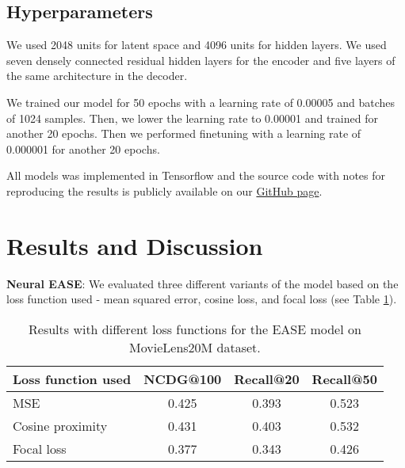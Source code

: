 \documentclass[conference]{IEEEtran}
\begin{document}
        \subsection{Hyperparameters}
        We used 2048 units for latent space and 4096 units for hidden layers. We used seven densely connected residual hidden layers for the encoder and five layers of the same architecture in the decoder.
        
        We trained our model for 50 epochs with a learning rate of 0.00005 and batches of 1024 samples. Then, we lower the learning rate to 0.00001 and trained for another 20 epochs. Then we performed finetuning with a learning rate of 0.000001 for another 20 epochs.
        
All models was implemented in Tensorflow\cite{tensorflow2015-whitepaper} and the source code with notes for reproducing the results is publicly available on our \href{https://github.com/zombak79/vasp}{GitHub page}.
    
\section{Results and Discussion}\label{results}
      
   
    \textbf{Neural EASE}: We evaluated three different variants of the model based on the loss function used - mean squared error, cosine loss, and focal loss (see Table \ref{tab:2}).
    
    \begin{table}[h]\label{tab:2}\caption{Results with different loss functions for the EASE model on MovieLens20M dataset.}
        \centering
        \begin{tabular}{@{}llll@{}}
            \toprule
            Loss function used & NCDG@100 & Recall@20 & Recall@50 \\ 
            \midrule
            MSE                & \multicolumn{1}{c}{0.425} & \multicolumn{1}{c}{0.393} & \multicolumn{1}{c}{0.523}           \\
            Cosine proximity & \multicolumn{1}{c}{0.431} & \multicolumn{1}{c}{0.403} & \multicolumn{1}{c}{0.532} \\
            Focal loss         &   \multicolumn{1}{c}{0.377} & \multicolumn{1}{c}{0.343} & \multicolumn{1}{c}{0.426}             \\ 
            \bottomrule
        \end{tabular}
        \centering
    \end{table}
    
\end{document}

